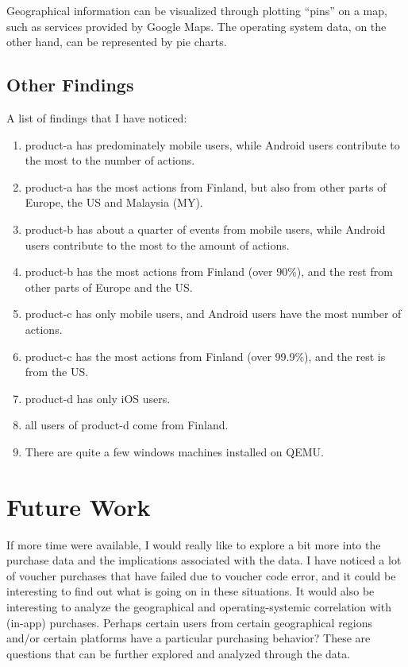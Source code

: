 \documentclass[12pt,letter]{article}
\newcommand{\be}{\begin{enumerate}}
\newcommand{\ee}{\end{enumerate}}
\begin{document}
  Geographical information can be visualized through plotting ``pins'' on a map,
  such as services provided by Google Maps. The operating system data, on the
  other hand, can be represented by pie charts.

  \subsection{Other Findings}
  A list of findings that I have noticed:
  \be
  \item product-a has predominately mobile users, while Android users contribute
      to the most to the number of actions.
  \item product-a has the most actions from Finland, but also from other parts
      of Europe, the US and Malaysia (MY).
  \item product-b has about a quarter of events from mobile users, while Android
      users contribute to the most to the amount of actions.
  \item product-b has the most actions from Finland (over 90\%), and the rest
      from other parts of Europe and the US.
  \item product-c has only mobile users, and Android
      users have the most number of actions.
  \item product-c has the most actions from Finland (over 99.9\%), and the rest
      is from the US.
  \item product-d has only iOS users.
  \item all users of product-d come from Finland.
  \item There are quite a few windows machines installed on QEMU.
  \ee

  \section{Future Work}
  If more time were available, I would really like to explore a bit more into
  the purchase data and the implications associated with the data. I have
  noticed a lot of voucher purchases that have failed due to voucher code error,
  and it could be interesting to find out what is going on in these situations.
  It would also be interesting to analyze the geographical and
  operating-systemic correlation with (in-app) purchases. Perhaps certain users
  from certain geographical regions and/or certain platforms have a particular
  purchasing behavior? These are questions that can be further explored and
  analyzed through the data.
\end{document}
